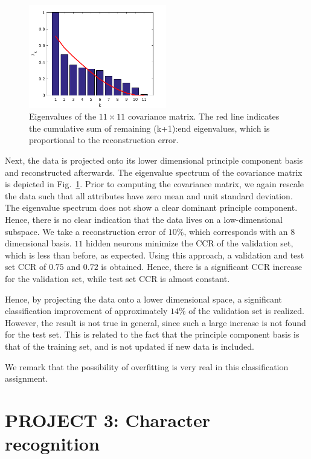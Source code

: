 \documentclass[pdftex,12pt,a4paper]{article}
\begin{document}
\begin{figure}
\centering
\includegraphics[width=6cm]{figs/eigenvalues.png}
\caption{Eigenvalues of the $11\times11$ covariance matrix. The red line indicates the cumulative sum of remaining (k+1):end eigenvalues, which is proportional to the reconstruction error. \label{fig:eigenvalues}}
\end{figure}

Next, the data is projected onto its lower dimensional principle component basis and reconstructed afterwards. The eigenvalue spectrum of the covariance matrix is depicted in Fig.~\ref{fig:eigenvalues}. Prior to computing the covariance matrix, we again rescale the data such that all attributes have zero mean and unit standard deviation. The eigenvalue spectrum does not show a clear dominant principle component. Hence, there is no clear indication that the data lives on a low-dimensional subspace. We take a reconstruction error of $10\%$, which corresponds with an $8$ dimensional basis. $11$ hidden neurons minimize the CCR of the validation set, which is less than before, as expected. Using this approach, a validation and test set CCR of $0.75$ and $0.72$ is obtained. Hence, there is a significant CCR increase for the validation set, while test set CCR is almost constant.

Hence, by projecting the data onto a lower dimensional space, a significant classification improvement of approximately $14 \%$ of the validation set is realized. However, the result is not true in general, since such a large increase is not found for the test set. This is related to the fact that the principle component basis is that of the training set, and is not updated if new data is included.

We remark that the possibility of overfitting is very real in this classification assignment. 

\newpage
\section{PROJECT 3: Character recognition}
\end{document}
